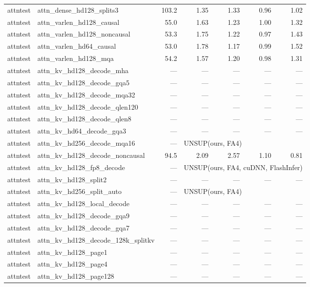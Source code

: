 \begin{longtable}{@{}llrrrrr@{}}
attntest & attn\_dense\_hd128\_splits3 & 103.2 & 1.35 & 1.33 & 0.96 & 1.02 \\
attntest & attn\_varlen\_hd128\_causal & 55.0 & 1.63 & 1.23 & 1.00 & 1.32 \\
attntest & attn\_varlen\_hd128\_noncausal & 53.3 & 1.75 & 1.22 & 0.97 & 1.43 \\
attntest & attn\_varlen\_hd64\_causal & 53.0 & 1.78 & 1.17 & 0.99 & 1.52 \\
attntest & attn\_varlen\_hd128\_mqa & 54.2 & 1.57 & 1.20 & 0.98 & 1.31 \\
attntest & attn\_kv\_hd128\_decode\_mha & --- & --- & --- & --- & --- \\
attntest & attn\_kv\_hd128\_decode\_gqa5 & --- & --- & --- & --- & --- \\
attntest & attn\_kv\_hd128\_decode\_mqa32 & --- & --- & --- & --- & --- \\
attntest & attn\_kv\_hd128\_decode\_qlen120 & --- & --- & --- & --- & --- \\
attntest & attn\_kv\_hd128\_decode\_qlen8 & --- & --- & --- & --- & --- \\
attntest & attn\_kv\_hd64\_decode\_gqa3 & --- & --- & --- & --- & --- \\
attntest & attn\_kv\_hd256\_decode\_mqa16 & --- & \multicolumn{4}{l}{UNSUP({ours, FA4})} \\
attntest & attn\_kv\_hd128\_decode\_noncausal & 94.5 & 2.09 & 2.57 & 1.10 & 0.81 \\
attntest & attn\_kv\_hd128\_fp8\_decode & --- & \multicolumn{4}{l}{UNSUP({ours, FA4, cuDNN, FlashInfer})} \\
attntest & attn\_kv\_hd128\_split2 & --- & --- & --- & --- & --- \\
attntest & attn\_kv\_hd256\_split\_auto & --- & \multicolumn{4}{l}{UNSUP({ours, FA4})} \\
attntest & attn\_kv\_hd128\_local\_decode & --- & --- & --- & --- & --- \\
attntest & attn\_kv\_hd128\_decode\_gqa9 & --- & --- & --- & --- & --- \\
attntest & attn\_kv\_hd128\_decode\_gqa7 & --- & --- & --- & --- & --- \\
attntest & attn\_kv\_hd128\_decode\_128k\_splitkv & --- & --- & --- & --- & --- \\
attntest & attn\_kv\_hd128\_page1 & --- & --- & --- & --- & --- \\
attntest & attn\_kv\_hd128\_page4 & --- & --- & --- & --- & --- \\
attntest & attn\_kv\_hd128\_page128 & --- & --- & --- & --- & --- \\

\end{longtable}
